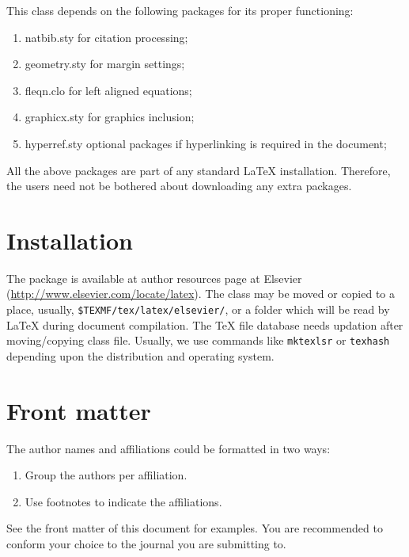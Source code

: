 \documentclass[a4paper,fleqn]{cas-sc}
\begin{document}
This class depends on the following packages
for its proper functioning:

\begin{enumerate}
\itemsep=0pt
\item {natbib.sty} for citation processing;
\item {geometry.sty} for margin settings;
\item {fleqn.clo} for left aligned equations;
\item {graphicx.sty} for graphics inclusion;
\item {hyperref.sty} optional packages if hyperlinking is
  required in the document;
\end{enumerate}  

All the above packages are part of any
standard \LaTeX{} installation.
Therefore, the users need not be
bothered about downloading any extra packages.

\section{Installation}

The package is available at author resources page at Elsevier
(\url{http://www.elsevier.com/locate/latex}).
The class may be moved or copied to a place, usually,\linebreak
\verb+$TEXMF/tex/latex/elsevier/+, %
or a folder which will be read                   
by \LaTeX{} during document compilation.  The \TeX{} file
database needs updation after moving/copying class file.  Usually,
we use commands like \verb+mktexlsr+ or \verb+texhash+ depending
upon the distribution and operating system.

\section{Front matter}

The author names and affiliations could be formatted in two ways:
\begin{enumerate}[(1)]
\item Group the authors per affiliation.
\item Use footnotes to indicate the affiliations.
\end{enumerate}
See the front matter of this document for examples. 
You are recommended to conform your choice to the journal you 
are submitting to.
\end{document}

